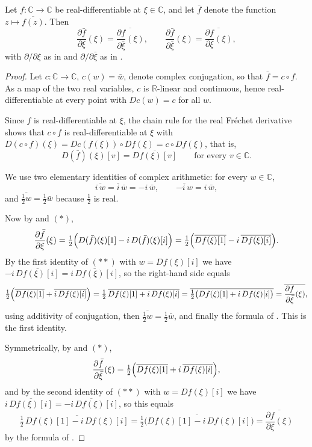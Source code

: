 \begin{lemma}
Let $f\colon\mathbb{C}\to\mathbb{C}$ be real-differentiable at
$\xi\in\mathbb{C}$, and let $\bar f$ denote the function
$z\mapsto\overline{f(z)}$.  Then
\[
  \frac{\partial\bar f}{\partial\xi}(\xi)
  =\overline{\frac{\partial f}{\partial\bar\xi}(\xi)},
  \qquad
  \frac{\partial\bar f}{\partial\bar\xi}(\xi)
  =\overline{\frac{\partial f}{\partial\xi}(\xi)},
\]
with $\partial/\partial\xi$ as in  and $\partial/\partial\bar\xi$
as in .
\end{lemma}
\begin{proof}
Let $c\colon\mathbb{C}\to\mathbb{C}$, $c(w)=\bar w$, denote complex
conjugation, so that $\bar f=c\circ f$.  As a map of the two real variables,
$c$ is $\mathbb{R}$-linear and continuous, hence real-differentiable at every
point with $Dc(w)=c$ for all $w$.

Since $f$ is real-differentiable at $\xi$, the chain rule for the real
Fr\'echet derivative shows that $c\circ f$ is real-differentiable at $\xi$ with
$D(c\circ f)(\xi)=Dc(f(\xi))\circ Df(\xi)=c\circ Df(\xi)$, that is,
\begin{equation}\tag{$*$}
  D(\bar f)(\xi)[v]=\overline{Df(\xi)[v]}\qquad\text{for every }v\in\mathbb{C}.
\end{equation}

We use two elementary identities of complex arithmetic: for every
$w\in\mathbb{C}$,
\begin{equation}\tag{$**$}
  \overline{i\,w}=\bar i\,\bar w=-i\,\bar w,
  \qquad
  \overline{-i\,w}=i\,\bar w ,
\end{equation}
and $\overline{\tfrac12 w}=\tfrac12\bar w$ because $\tfrac12$ is real.

Now by  and $(*)$,
\[
  \frac{\partial\bar f}{\partial\xi}(\xi)
  =\tfrac12\Bigl(D(\bar f)(\xi)[1]-i\,D(\bar f)(\xi)[i]\Bigr)
  =\tfrac12\Bigl(\overline{Df(\xi)[1]}-i\,\overline{Df(\xi)[i]}\Bigr).
\]
By the first identity of $(**)$ with $w=Df(\xi)[i]$ we have
$-i\,\overline{Df(\xi)[i]}=\overline{i\,Df(\xi)[i]}$, so the right-hand side
equals
\[
  \tfrac12\Bigl(\overline{Df(\xi)[1]}+\overline{i\,Df(\xi)[i]}\Bigr)
  =\tfrac12\,\overline{Df(\xi)[1]+i\,Df(\xi)[i]}
  =\overline{\tfrac12\bigl(Df(\xi)[1]+i\,Df(\xi)[i]\bigr)}
  =\overline{\frac{\partial f}{\partial\bar\xi}(\xi)},
\]
using additivity of conjugation, then $\overline{\tfrac12w}=\tfrac12\bar w$,
and finally the formula of .  This is the first identity.

Symmetrically, by  and $(*)$,
\[
  \frac{\partial\bar f}{\partial\bar\xi}(\xi)
  =\tfrac12\Bigl(\overline{Df(\xi)[1]}+i\,\overline{Df(\xi)[i]}\Bigr),
\]
and by the second identity of $(**)$ with $w=Df(\xi)[i]$ we have
$i\,\overline{Df(\xi)[i]}=\overline{-i\,Df(\xi)[i]}$, so this equals
\[
  \tfrac12\,\overline{Df(\xi)[1]-i\,Df(\xi)[i]}
  =\overline{\tfrac12\bigl(Df(\xi)[1]-i\,Df(\xi)[i]\bigr)}
  =\overline{\frac{\partial f}{\partial\xi}(\xi)}
\]
by the formula of .
\end{proof}
